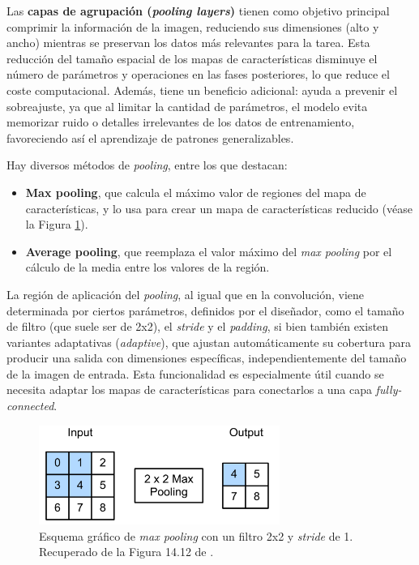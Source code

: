 Las \textbf{capas de agrupación (\textit{pooling layers})} tienen como objetivo principal comprimir la 
información de la imagen, reduciendo sus dimensiones (alto y ancho) mientras se preservan los datos más 
relevantes para la tarea. Esta reducción del tamaño espacial de los mapas de características disminuye el 
número de parámetros y operaciones en las fases posteriores, lo que reduce el coste computacional. Además, 
tiene un beneficio adicional: ayuda a prevenir el sobreajuste, ya que al limitar la cantidad de parámetros, 
el modelo evita memorizar ruido o detalles irrelevantes de los datos de entrenamiento, favoreciendo así el 
aprendizaje de patrones generalizables.

Hay diversos métodos de \textit{pooling}, entre los que destacan:

\begin{itemize}

    \item \textbf{Max pooling}, que calcula el máximo valor de regiones del mapa de características, y lo
    usa para crear un mapa de características reducido (véase la Figura \ref{fig:max_pooling}).

    \item \textbf{Average pooling}, que reemplaza el valor máximo del \textit{max pooling} por el cálculo de
    la media entre los valores de la región. 

\end{itemize}

La región de aplicación del \textit{pooling}, al igual que en la convolución, viene determinada por ciertos 
parámetros, definidos por el diseñador, como el tamaño de filtro (que suele ser de 2x2), el \textit{stride} 
y el \textit{padding}, si bien también existen variantes  adaptativas (\textit{adaptive}), que ajustan
automáticamente su cobertura para producir una salida con dimensiones específicas, independientemente del 
tamaño de la imagen de entrada. Esta funcionalidad es especialmente útil cuando se necesita adaptar los mapas
de características para conectarlos a una capa \textit{fully-connected}. 

\begin{figure}[h]
    \centering
    \includegraphics[width=0.7\textwidth]{capitulos/cap_02/imagenes/max_pooling.png}
    \caption{
        Esquema gráfico de \textit{max pooling} con un filtro 2x2 y \textit{stride} de 1.
        Recuperado de la Figura 14.12 de \cite{murphy2022}.
    } 
    \label{fig:max_pooling}
\end{figure}



